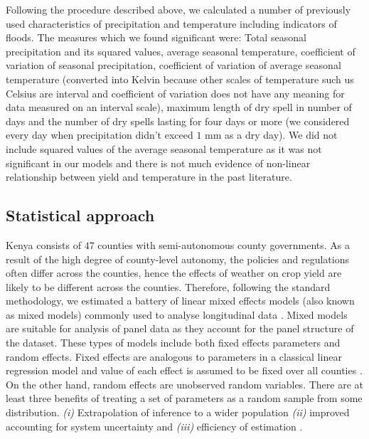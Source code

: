 \documentclass[12pt]{iopart}
\begin{document}
Following the procedure described above, we calculated a number of previously used characteristics of precipitation and temperature including indicators of floods. The measures which we found significant were: Total seasonal precipitation and its squared values, average seasonal temperature, coefficient of variation of seasonal precipitation, coefficient of variation of average seasonal temperature (converted into Kelvin because other scales of temperature such us Celsius are interval and coefficient of variation does not have any meaning for data measured on an interval scale),  maximum length of dry spell in number of days and the number of dry spells lasting for four days or more (we considered every day when precipitation didn't exceed $1$ mm as a dry day). We did not include squared values of the average seasonal temperature as it was not significant in our models and there is not much evidence of non-linear relationship between yield and temperature in the past literature.
\subsection{Statistical approach}\label{stats}


\sloppy
Kenya consists of $47$ counties with semi-autonomous county governments. As a result of the high degree of county-level autonomy, the policies and regulations often differ across the counties, hence the effects of weather on crop yield are likely to be different across the counties. Therefore, following the standard methodology, we estimated a battery of linear mixed effects models (also known as mixed models) commonly used to analyse longitudinal data \cite{bates2000mixed}. Mixed models are suitable for analysis of panel data as they account for the panel structure of the dataset. These types of models include both fixed effects parameters and random effects. Fixed effects are analogous to parameters in a classical linear regression model and value of each effect is assumed to be fixed over all counties \cite{bates2010lme4}. On the other hand, random effects are unobserved random variables. There are at least three benefits of treating a set of parameters as a random sample from some distribution. \textit{(i)} Extrapolation of inference to a wider population \textit{(ii)} improved accounting for system uncertainty and \textit{(iii)} efficiency of estimation \cite{KERYch9,KERYch12}.
\end{document}
